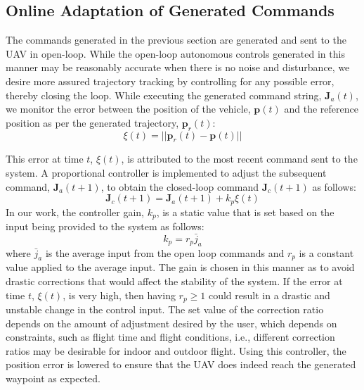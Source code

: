 \documentclass[letterpaper, 10 pt, conference]{ieeeconf}  %
\newcommand\NB[1]{$\spadesuit$\footnote{NB: #1}}
\begin{document}
\subsection{Online Adaptation of Generated Commands} \label{sec:adapt}

The commands generated in the previous section are generated and sent to the UAV in open-loop. While the open-loop autonomous controls generated in this manner may be reasonably accurate when there is no noise and disturbance, we desire more assured trajectory tracking by controlling for any possible error, thereby closing the loop. While executing the generated command string, $\bm{J}_a(t)$, we monitor the error between the position of the vehicle, $\bm{p}(t)$ and the reference position as per the generated trajectory, $\bm{p}_r(t)$:
\begin{equation}
    \xi(t) = ||\bm{p}_r(t)-\bm{p}(t)||
\end{equation}

This error at time $t$, $\xi(t)$, is attributed to the most recent command sent to the system. A proportional controller is implemented to adjust the subsequent command, $\bm{J}_a(t+1)$, to obtain the closed-loop command $\bm{J}_c(t+1)$ as follows:
\begin{equation}
    \bm{J}_c(t+1) = \bm{J}_a(t+1) + k_p\xi(t)
\end{equation}
In our work, the controller gain, $k_p$, is a static value that is set based on the input being provided to the system as follows:
\begin{equation} \label{eq:ctrls}
    k_p = r_p\bar{j}_a
\end{equation}
where $\bar{j}_a$ is the average input from the open loop commands and $r_p$ is a constant value applied to the average input. The gain is chosen in this manner as to avoid drastic corrections that would affect the stability of the system. If the error at time $t$, $\xi(t)$, is very high, then having $r_p \geq 1$ could result in a drastic and unstable change in the control input. The set value of the correction ratio depends on the amount of adjustment desired by the user, which depends on constraints, such as flight time and flight conditions, i.e., different correction ratios may be desirable for indoor and outdoor flight. Using this controller, the position error is lowered to ensure that the UAV does indeed reach the generated waypoint as expected.  %
\end{document}

